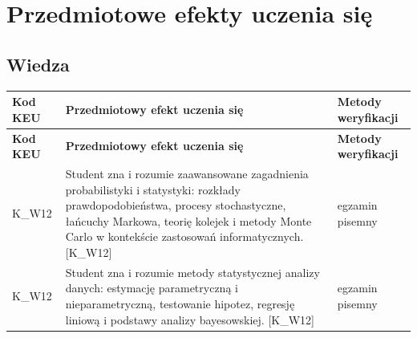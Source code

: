 \documentclass[12pt, a4paper]{article}
\newcommand{\thdrule}{\noalign{\global\setlength{\extrarowheight}{0pt}}}
\newcommand{\thdend}{\noalign{\global\setlength{\extrarowheight}{3pt}}}
\begin{document}
\section{Przedmiotowe efekty uczenia się}

\subsection*{Wiedza}
{\scriptsize
\begin{longtable}{m{1.6cm}m{9.0cm}m{4.2cm}}
\thdrule\toprule
\rowcolor{pjatkRed} {\color{white}\footnotesize\textbf{\vphantom{Ag}Kod KEU}} & {\color{white}\footnotesize\textbf{\vphantom{Ag}Przedmiotowy efekt uczenia się}} & {\color{white}\footnotesize\textbf{\vphantom{Ag}Metody weryfikacji}} \\
\midrule\thdend
\endfirsthead
\thdrule\toprule
\rowcolor{pjatkRed} {\color{white}\footnotesize\textbf{\vphantom{Ag}Kod KEU}} & {\color{white}\footnotesize\textbf{\vphantom{Ag}Przedmiotowy efekt uczenia się}} & {\color{white}\footnotesize\textbf{\vphantom{Ag}Metody weryfikacji}} \\
\midrule\thdend
\endhead
  \rowcolor{tableRowLight} K\_W12 & Student zna i rozumie zaawansowane zagadnienia probabilistyki i statystyki: rozkłady prawdopodobieństwa, procesy stochastyczne, łańcuchy Markowa, teorię kolejek i metody Monte Carlo w kontekście zastosowań informatycznych. {[}K\_W12{]} & egzamin pisemny \\
  \rowcolor{tableRowAlt} K\_W12 & Student zna i rozumie metody statystycznej analizy danych: estymację parametryczną i nieparametryczną, testowanie hipotez, regresję liniową i podstawy analizy bayesowskiej. {[}K\_W12{]} & egzamin pisemny \\
\bottomrule
\end{longtable}}
\end{document}
